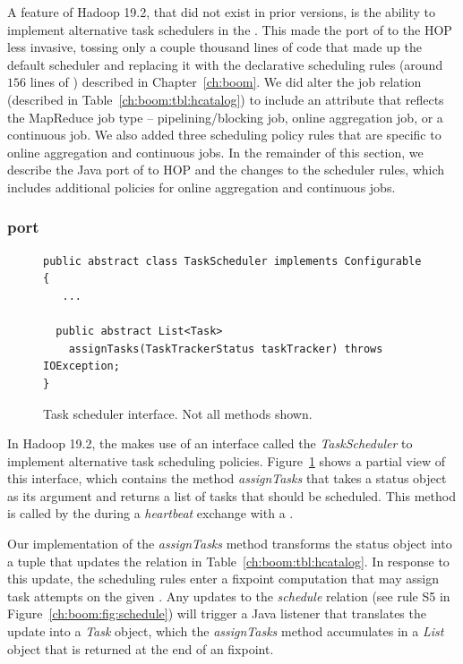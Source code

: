 A feature of Hadoop 19.2, that did not exist in prior versions, is the ability to implement alternative task schedulers
in the \JT. This made the port of \JOL to the HOP \JT less invasive, tossing only a couple thousand lines of code
that made up the default scheduler and replacing it with the declarative scheduling rules (around $156$ lines of \OVERLOG) 
described in Chapter~\ref{ch:boom}. We did alter the job relation (described in Table~\ref{ch:boom:tbl:hcatalog}) to include an attribute 
that reflects the MapReduce job type -- pipelining/blocking job, online aggregation job, or a continuous job. We also added three
scheduling policy rules that are specific to online aggregation and continuous jobs. In the remainder of this section, we describe the 
Java port of \JOL to HOP and the changes to the scheduler rules, which includes additional policies for online aggregation and 
continuous jobs.

\subsubsection{\JOL port}
\begin{figure}
\ssp
\begin{minipage}{\linewidth}
\centering
\begin{verbatim}
public abstract class TaskScheduler implements Configurable {
   ...
   
  public abstract List<Task> 
  	assignTasks(TaskTrackerStatus taskTracker) throws IOException;
}
\end{verbatim}
\end{minipage}
\caption{Task scheduler interface. Not all methods shown.}
\label{ch:hop:fig:taskscheduler}
\end{figure}


In Hadoop 19.2, the \JT makes use of an interface called the {\em TaskScheduler} to implement alternative task
scheduling policies. Figure~\ref{ch:hop:fig:taskscheduler} shows a partial view of this interface, which contains the
method {\em assignTasks} that takes a \TT status object as its argument and returns a list of tasks that should be 
scheduled. This method is called by the \JT during a {\em heartbeat} exchange with a \TT.  

Our implementation of the {\em assignTasks} method transforms the \TT status object into a tuple that updates the
 relation in Table~\ref{ch:boom:tbl:hcatalog}. In response to this update, the scheduling rules enter a 
fixpoint computation that may assign task attempts on the given \TT. Any updates to the {\em schedule} relation 
(see rule S5 in Figure~\ref{ch:boom:fig:schedule}) will trigger a Java listener that translates the update into a {\em Task} 
object, which the {\em assignTasks} method accumulates in a {\em List} object that is returned at the end of an \OVERLOG fixpoint. 

